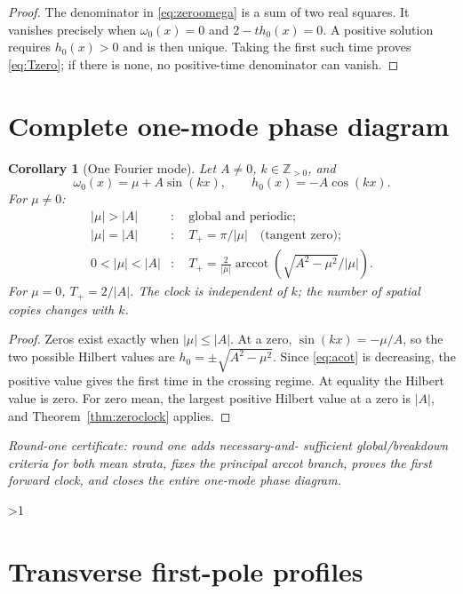 \documentclass[10pt]{article}
\newcommand{\ZZ}{\mathbb Z}
\newcommand{\acot}{\operatorname{arccot}}
\newtheorem{corollary}{Corollary}
\begin{document}
\begin{proof}
The denominator in \eqref{eq:zeroomega} is a sum of two real squares.  It
vanishes precisely when $\omega_0(x)=0$ and $2-th_0(x)=0$.  A positive
solution requires $h_0(x)>0$ and is then unique.  Taking the first such time
proves \eqref{eq:Tzero}; if there is none, no positive-time denominator can
vanish.
\end{proof}

\section{Complete one-mode phase diagram}

\begin{corollary}[One Fourier mode]\label{cor:onemode}
Let $A\ne0$, $k\in\ZZ_{>0}$, and
\begin{equation}
 \omega_0(x)=\mu+A\sin(kx),\qquad h_0(x)=-A\cos(kx). \label{eq:onemode}
\end{equation}
For $\mu\ne0$:
\begin{align*}
 |\mu|>|A|&:\quad \text{global and periodic};\\
 |\mu|=|A|&:\quad T_+=\pi/|\mu|\quad\text{(tangent zero)};\\
 0<|\mu|<|A|&:\quad
 T_+=\frac{2}{|\mu|}\acot(
 \sqrt{A^2-\mu^2}/|\mu|).
\end{align*}
For $\mu=0$, $T_+=2/|A|$.  The clock is independent of $k$; the number of
spatial copies changes with $k$.
\end{corollary}

\begin{proof}
Zeros exist exactly when $|\mu|\le|A|$.  At a zero,
$\sin(kx)=-\mu/A$, so the two possible Hilbert values are
$h_0=\pm\sqrt{A^2-\mu^2}$.  Since \eqref{eq:acot} is decreasing, the
positive value gives the first time in the crossing regime.  At equality
the Hilbert value is zero.  For zero mean, the largest positive Hilbert
value at a zero is $|A|$, and Theorem~\ref{thm:zeroclock} applies.
\end{proof}

\noindent\textit{Round-one certificate: round one adds necessary-and-
sufficient global/breakdown criteria for both mean strata, fixes the
principal arccot branch, proves the first forward clock, and closes the
entire one-mode phase diagram.}
\fi

\ifnum\CRevisionRound>1
\section{Transverse first-pole profiles}
\end{document}
